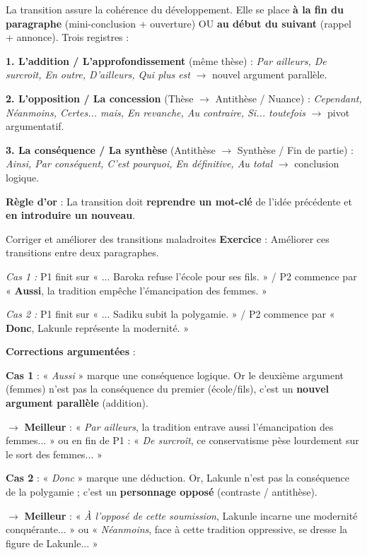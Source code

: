 \documentclass[11pt]{article}
\newcommand{\cle}[1]{{\popxbold\color{popdark}#1}}
\begin{document}
\begin{methode}
La transition assure la \cle{cohérence} du développement. Elle se place \textbf{à la fin du paragraphe} (mini-conclusion + ouverture) OU \textbf{au début du suivant} (rappel + annonce). Trois registres :\par
\textbf{1. L'addition / L'approfondissement} (même thèse) : \emph{Par ailleurs, De surcroît, En outre, D'ailleurs, Qui plus est} $\rightarrow$ nouvel argument parallèle.\par
\textbf{2. L'opposition / La concession} (Thèse $\rightarrow$ Antithèse / Nuance) : \emph{Cependant, Néanmoins, Certes... mais, En revanche, Au contraire, Si... toutefois} $\rightarrow$ pivot argumentatif.\par
\textbf{3. La conséquence / La synthèse} (Antithèse $\rightarrow$ Synthèse / Fin de partie) : \emph{Ainsi, Par conséquent, C'est pourquoi, En définitive, Au total} $\rightarrow$ conclusion logique.\par
\textbf{Règle d'or} : La transition doit \textbf{reprendre un mot-clé} de l'idée précédente et \textbf{en introduire un nouveau}.
\end{methode}

\begin{exoresolu}{Corriger et améliorer des transitions maladroites}
\textbf{Exercice} : Améliorer ces transitions entre deux paragraphes.\par
\textit{Cas 1 :} P1 finit sur « ... Baroka refuse l'école pour ses fils. » / P2 commence par « \textbf{Aussi}, la tradition empêche l'émancipation des femmes. »\par
\textit{Cas 2 :} P1 finit sur « ... Sadiku subit la polygamie. » / P2 commence par « \textbf{Donc}, Lakunle représente la modernité. »\par
\tcblower
\textbf{Corrections argumentées} :\par
\textbf{Cas 1} : « \emph{Aussi} » marque une conséquence logique. Or le deuxième argument (femmes) n'est pas la conséquence du premier (école/fils), c'est un \textbf{nouvel argument parallèle} (addition).\par
$\rightarrow$ \textbf{Meilleur} : « \emph{Par ailleurs}, la tradition entrave aussi l'émancipation des femmes... » ou en fin de P1 : « \emph{De surcroît}, ce conservatisme pèse lourdement sur le sort des femmes... »\par
\textbf{Cas 2} : « \emph{Donc} » marque une déduction. Or, Lakunle n'est pas la conséquence de la polygamie ; c'est un \textbf{personnage opposé} (contraste / antithèse).\par
$\rightarrow$ \textbf{Meilleur} : « \emph{À l'opposé de cette soumission}, Lakunle incarne une modernité conquérante... » ou « \emph{Néanmoins}, face à cette tradition oppressive, se dresse la figure de Lakunle... »
\end{exoresolu}
\end{document}
